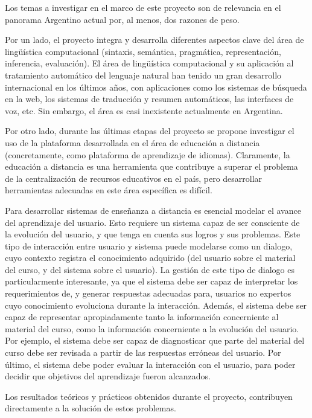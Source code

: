 
Los temas a investigar en el marco de este proyecto son de relevancia en el panorama Argentino actual por, al menos, dos razones de peso.

Por un lado, el proyecto
integra y desarrolla diferentes aspectos clave del \'area de ling\"u\'istica computacional (sintaxis, sem\'antica, pragm\'atica, representaci\'on,
inferencia, evaluaci\'on). El \'area de ling\"u\'istica computacional y su
aplicaci\'on al tratamiento autom\'atico del lenguaje natural han tenido un
gran desarrollo internacional en los \'ultimos a\~nos, con aplicaciones como los sistemas de b\'usqueda en la web, los sistemas de traducci\'on y resumen autom\'aticos, las interfaces de voz, etc. Sin embargo, el \'area es casi inexistente actualmente en Argentina.


Por otro lado, durante las \'ultimas etapas
del proyecto se propone investigar el uso de la plataforma
desarrollada en el \'area de educaci\'on a distancia (concretamente, como
plataforma de aprendizaje de idiomas).
Claramente, la educaci\'on a distancia es una herramienta
que contribuye a superar el problema de la centralizaci\'on de recursos
educativos en el pa\'is, pero desarrollar herramientas adecuadas en
este \'area espec\'ifica es dif\'icil.

Para desarrollar sistemas de ense\~nanza a distancia es esencial modelar el avance del aprendizaje del usuario. Esto requiere un sistema capaz de ser consciente de la evoluci\'on del usuario, y que tenga en cuenta sus logros y sus problemas. Este tipo de interacci\'on entre usuario y sistema puede modelarse como un dialogo, cuyo contexto registra el conocimiento adquirido (del usuario sobre el material del curso, y del sistema sobre el usuario). La gesti\'on de este tipo de dialogo es particularmente interesante, ya que el sistema debe ser capaz de interpretar los requerimientos de, y generar respuestas adecuadas para, usuarios no expertos cuyo conocimiento evoluciona durante la interacci\'on. Adem\'as, el sistema debe ser capaz de representar apropiadamente tanto la informaci\'on concerniente al material del curso, como la informaci\'on concerniente a la evoluci\'on del usuario. Por ejemplo, el sistema debe ser capaz de diagnosticar que parte del material del curso debe ser revisada a partir de las respuestas err\'oneas del usuario.  Por \'ultimo, el sistema debe poder evaluar la interacci\'on con el usuario, para poder decidir
que objetivos del aprendizaje fueron alcanzados.

Los resultados te\'oricos y pr\'acticos obtenidos durante el proyecto,
contribuyen directamente a la soluci\'on de estos problemas.

